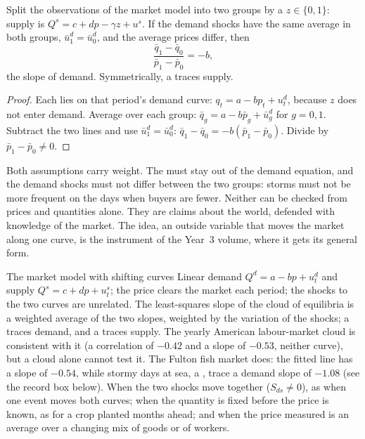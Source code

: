 \begin{proposition}\label{prop:b1:models-and-data:trace}
Split the observations of the market model into two groups by a  $z \in \{0, 1\}$: supply is $Q^s = c + dp - \gamma z + u^s$. If the
demand shocks have the same average in both groups, $\bar u^d_1 = \bar
u^d_0$, and the average prices differ, then
\[
\frac{\bar q_1 - \bar q_0}{\bar p_1 - \bar p_0} = -b ,
\]
the slope of demand. Symmetrically, a  traces supply.
\end{proposition}

\begin{proof}
Each  lies on that period's demand curve: $q_t = a - b p_t +
u^d_t$, because $z$ does not enter demand. Average over each group: $\bar
q_g = a - b \bar p_g + \bar u^d_g$ for $g = 0, 1$. Subtract the two lines and
use $\bar u^d_1 = \bar u^d_0$: $\bar q_1 - \bar q_0 = -b(\bar p_1 - \bar
p_0)$. Divide by $\bar p_1 - \bar p_0 \neq 0$.
\end{proof}

Both assumptions carry weight. The  must stay out of the demand
equation, and the demand shocks must not differ between the two groups:
storms must not be more frequent on the days when buyers are fewer. Neither
can be checked from prices and quantities alone. They are claims about the
world, defended with knowledge of the market. The idea, an outside variable
that moves the market along one curve, is the instrument of the Year~3
volume, where it gets its general form.

\begin{model}{The market model with shifting curves}
\assumes Linear demand $Q^d = a - bp + u^d_t$ and supply $Q^s = c + dp +
u^s_t$; the price clears the market each period; the shocks to the two
curves are unrelated.
\predicts The least-squares slope of the cloud of equilibria is a weighted
average of the two slopes, weighted by the variation of the shocks; a
 traces demand, and a  traces supply.
\tested The yearly American labour-market cloud is consistent with it (a
correlation of $-0.42$ and a slope of $-0.53$, %
neither curve), but a cloud alone cannot test it. The Fulton fish market
does: the fitted line has a slope of $-0.54$, while stormy days at sea, a
, trace a demand slope of $-1.08$ (see the record box
below). %
\breaks When the two shocks move together ($S_{ds} \neq 0$), as when one
event moves both curves; when the quantity is fixed before the price is
known, as for a crop planted months ahead; and when the price measured is
an average over a changing mix of goods or of workers.
\end{model}

